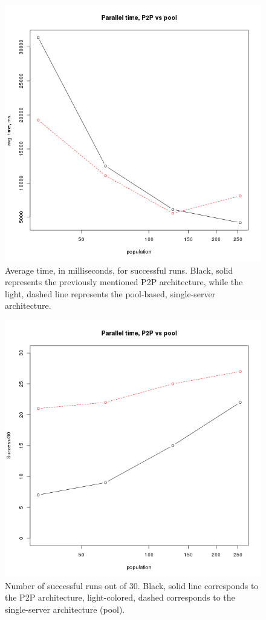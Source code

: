 \documentclass{sig-alternate}
\begin{document}
\begin{figure}[htb]
\centering
   \includegraphics[scale=0.4]{par-pool-time-pop.png}
\caption{Average time, in milliseconds, for successful runs. Black,
  solid represents the previously mentioned P2P architecture, while
  the light, dashed line represents the pool-based, single-server
  architecture. }
\label{fig:p:time}
\end{figure}
%
\begin{figure}[htb]
\centering
   \includegraphics[scale=0.4]{par-pool-hits-pop.png}
\caption{Number of successful runs out of 30. Black, solid line
  corresponds to the P2P architecture, light-colored, dashed
corresponds to the single-server architecture (pool).}
\label{fig:p:hits}
\end{figure}
\end{document}
